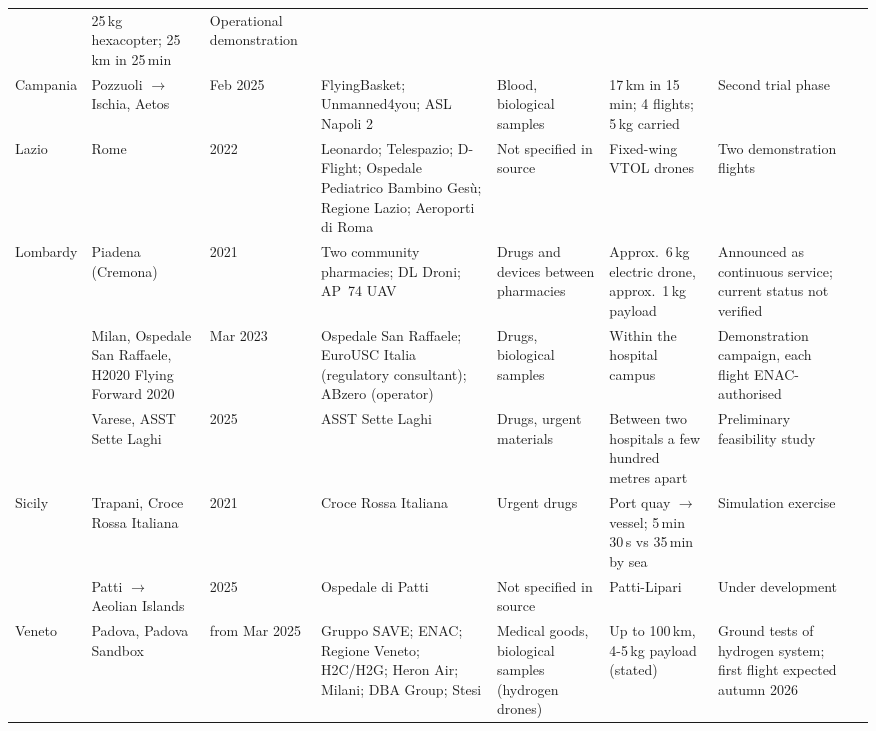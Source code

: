 \begin{landscape}
\begin{longtable}{G{0.078} L{0.119} L{0.064} L{0.200} L{0.132} L{0.183} L{0.151} L{0.073}}
& 25\,kg hexacopter; 25\,km in 25\,min
& Operational demonstration
& \cite{logisticamente_miulli} \\
\grouprule
Campania
& Pozzuoli $\to$ Ischia, Aetos
& Feb 2025
& FlyingBasket; Unmanned4you; ASL Napoli 2
& Blood, biological samples
& 17\,km in 15\,min; 4 flights; 5\,kg carried
& Second trial phase
& \cite{disalute_aetos, socialfarma_aetos} \\
\grouprule
Lazio
& Rome
& 2022
& Leonardo; Telespazio; D-Flight; Ospedale Pediatrico Bambino Ges\`u; Regione Lazio; Aeroporti di Roma
& Not specified in source
& Fixed-wing VTOL drones
& Two demonstration flights
& \cite{meteoweb_2022} \\
\grouprule
Lombardy
& Piadena (Cremona)
& 2021
& Two community pharmacies; DL Droni; AP~74 UAV
& Drugs and devices between pharmacies
& Approx.\ 6\,kg electric drone, approx.\ 1\,kg payload
& Announced as continuous service; current status not verified
& \cite{pharmacyscanner_piadena} \\
& Milan, Ospedale San Raffaele, H2020 Flying Forward 2020
& Mar 2023
& Ospedale San Raffaele; EuroUSC Italia (regulatory consultant); ABzero (operator)
& Drugs, biological samples
& Within the hospital campus
& Demonstration campaign, each flight ENAC-authorised
& \cite{hsr_ff2020, trasportoeuropa_hsr} \\
& Varese, ASST Sette Laghi
& 2025
& ASST Sette Laghi
& Drugs, urgent materials
& Between two hospitals a few hundred metres apart
& Preliminary feasibility study
& \cite{prealpina_varese} \\
\grouprule
Sicily
& Trapani, Croce Rossa Italiana
& 2021
& Croce Rossa Italiana
& Urgent drugs
& Port quay $\to$ vessel; 5\,min 30\,s vs 35\,min by sea
& Simulation exercise
& \cite{today_cri} \\
& Patti $\to$ Aeolian Islands
& 2025
& Ospedale di Patti
& Not specified in source
& Patti-Lipari
& Under development
& \cite{sanitadigitale_boom} \\
\grouprule
Veneto
& Padova, Padova Sandbox
& from Mar 2025
& Gruppo SAVE; ENAC; Regione Veneto; H2C/H2G; Heron Air; Milani; DBA Group; Stesi
& Medical goods, biological samples (hydrogen drones)
& Up to 100\,km, 4-5\,kg payload (stated)
& Ground tests of hydrogen system; first flight expected autumn 2026
& \cite{hydrogennews_sandbox, nordest24_sandbox} \\
\end{longtable}
\end{landscape}
